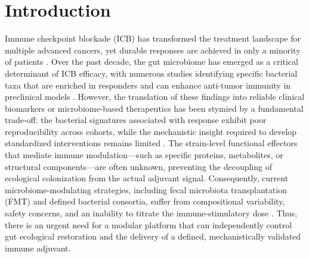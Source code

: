 \documentclass{article}
\begin{document}
\section{Introduction}
Immune checkpoint blockade (ICB) has transformed the treatment landscape for multiple advanced cancers, yet durable responses are achieved in only a minority of patients \cite{Sharma2017Cell}. Over the past decade, the gut microbiome has emerged as a critical determinant of ICB efficacy, with numerous studies identifying specific bacterial taxa that are enriched in responders and can enhance anti-tumor immunity in preclinical models \cite{Vetizou2015Science, Sivan2015Science, Gopalakrishnan2018Science, Routy2018Science, Matson2018Science}. However, the translation of these findings into reliable clinical biomarkers or microbiome-based therapeutics has been stymied by a fundamental trade-off: the bacterial signatures associated with response exhibit poor reproducibility across cohorts, while the mechanistic insight required to develop standardized interventions remains limited \cite{Zitvogel2018Cell, Derosa2022NatureMedicine}. The strain-level functional effectors that mediate immune modulation—such as specific proteins, metabolites, or structural components—are often unknown, preventing the decoupling of ecological colonization from the actual adjuvant signal. Consequently, current microbiome-modulating strategies, including fecal microbiota transplantation (FMT) and defined bacterial consortia, suffer from compositional variability, safety concerns, and an inability to titrate the immune-stimulatory dose \cite{Baruch2020Science, Dizman2022NatureMedicine}. Thus, there is an urgent need for a modular platform that can independently control gut ecological restoration and the delivery of a defined, mechanistically validated immune adjuvant.
\end{document}
